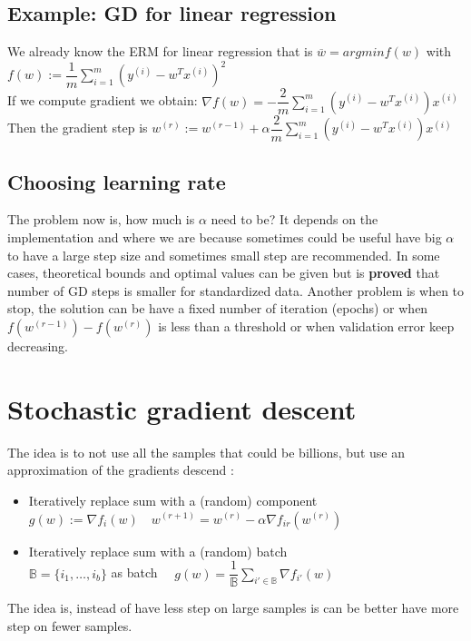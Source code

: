 \subsection{Example: GD for linear regression}

We already know the ERM for linear regression that is $ \overline{w} = argmin f(w)$ with $  f(w) := \dfrac{1}{m} \sum\limits_{i=1}^m ( y^{(i)} - w^T x^{(i)})^2 $\\
If we compute gradient we obtain: $ \nabla f(w) = - \dfrac{2}{m} \sum\limits_{i=1}^m ( y^{(i)} - w^T x^{(i)}) x^{(i)} $\\
Then the gradient step is $ w^{(r)} := w^{(r-1)} + \alpha \dfrac{2}{m} \sum\limits_{i=1}^m ( y^{(i)} - w^T x^{(i)}) x^{(i)}$
\subsection{Choosing learning rate}
The problem now is,  how much is $\alpha$ need to be? It depends on the implementation and where we are because sometimes could be useful have big $\alpha$ to have a large step size and sometimes small step are recommended. In some cases, theoretical bounds and optimal values can be given but is \textbf{proved} that number of GD steps is smaller for standardized data. Another problem is when to stop, the solution can be have a fixed number of iteration (epochs) or when $ f(w^{(r-1)} ) - f(w^{(r)}) $ is less than a threshold or when validation error keep decreasing.

\section{Stochastic gradient descent}

The idea is to not use all the samples that could be billions, but use an approximation of the gradients descend :
\begin{itemize}
    \item Iteratively replace sum with a (random) component \\
    $g(w) := \nabla f_{i}(w) \quad w^{(r+1)} = w^{(r)} - \alpha \nabla f_{ir} (w^{(r)})$ 
    \item Iteratively replace sum with a (random) batch\\
    $ \mathbb{B} = \{ i_1, \dots , i_b\}  $ as batch $\quad g(w) = \dfrac{1}{\mathbb{B}} \sum\limits_{i' \in \mathbb{B}} \nabla f_{i'} (w)$
\end{itemize}

The idea is, instead of have less step on large samples is can be better have more step on fewer samples.

